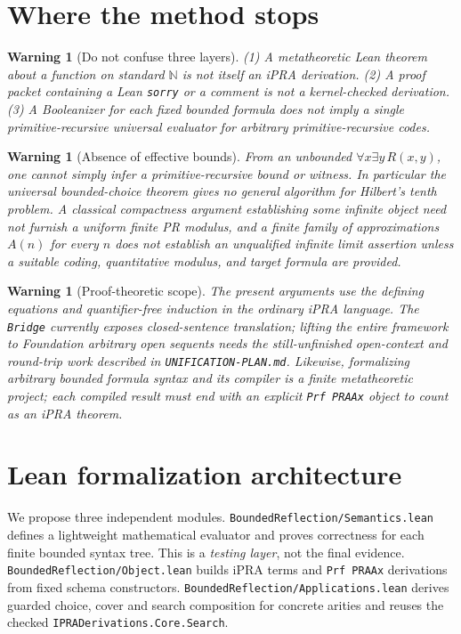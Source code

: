 \documentclass[11pt]{article}
\newtheorem{warning}[theorem]{Warning}
\begin{document}
\section{Where the method stops}
\begin{warning}[Do not confuse three layers]
(1) A metatheoretic Lean theorem about a function on standard $\mathbb N$ is not itself an iPRA derivation. (2) A proof packet containing a Lean \texttt{sorry} or a comment is not a kernel-checked derivation. (3) A Booleanizer for each \emph{fixed bounded formula} does not imply a single primitive-recursive universal evaluator for arbitrary primitive-recursive codes.
\end{warning}
\begin{warning}[Absence of effective bounds]
From an unbounded $\forall x\exists y\,R(x,y)$, one cannot simply infer a primitive-recursive bound or witness. In particular the universal bounded-choice theorem gives no general algorithm for Hilbert's tenth problem. A classical compactness argument establishing some infinite object need not furnish a uniform finite PR modulus, and a finite family of approximations $A(n)$ for every $n$ does not establish an unqualified infinite limit assertion unless a suitable coding, quantitative modulus, and target formula are provided.
\end{warning}
\begin{warning}[Proof-theoretic scope]
The present arguments use the defining equations and quantifier-free induction in the \emph{ordinary} iPRA language. The \texttt{Bridge} currently exposes closed-sentence translation; lifting the entire framework to Foundation arbitrary open sequents needs the still-unfinished open-context and round-trip work described in \texttt{UNIFICATION-PLAN.md}. Likewise, formalizing arbitrary bounded formula syntax and its compiler is a finite metatheoretic project; each compiled result must end with an explicit \texttt{Prf PRAAx} object to count as an iPRA theorem.
\end{warning}

\section{Lean formalization architecture}
We propose three independent modules. \texttt{BoundedReflection/Semantics.lean} defines a lightweight mathematical evaluator and proves correctness for each finite bounded syntax tree. This is a \emph{testing layer}, not the final evidence. \texttt{BoundedReflection/Object.lean} builds iPRA terms and \texttt{Prf PRAAx} derivations from fixed schema constructors. \texttt{BoundedReflection/Applications.lean} derives guarded choice, cover and search composition for concrete arities and reuses the checked \texttt{IPRADerivations.Core.Search}.
\end{document}
